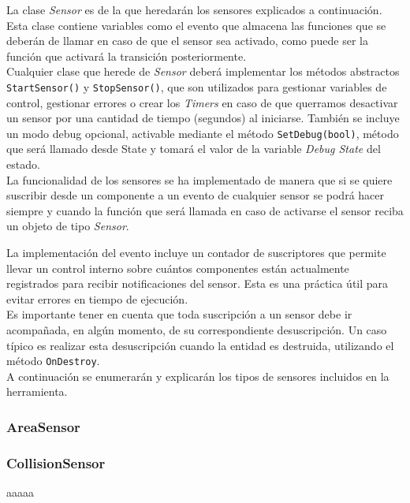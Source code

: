 La clase \textit{Sensor} es de la que heredarán los sensores explicados a continuación. Esta clase contiene variables como el evento que almacena las funciones que se deberán de llamar en caso de que el sensor sea activado, como puede ser la función que activará la transición posteriormente.\\

Cualquier clase que herede de \textit{Sensor} deberá implementar los métodos abstractos \texttt{StartSensor()} y \texttt{StopSensor()}, que son utilizados para gestionar variables de control, gestionar errores o crear los \textit{Timers} en caso de que querramos desactivar un sensor por una cantidad de tiempo (segundos) al iniciarse. También se incluye un modo debug opcional, activable mediante el método \texttt{SetDebug(bool)}, método que será llamado desde State y tomará el valor de la variable \textit{Debug State} del estado.\\

La funcionalidad de los sensores se ha implementado de manera que si se quiere suscribir desde un componente a un evento de cualquier sensor se podrá hacer siempre y cuando la función que será llamada en caso de activarse el sensor reciba un objeto de tipo \textit{Sensor}.\\


La implementación del evento incluye un contador de suscriptores que permite llevar un control interno sobre cuántos componentes están actualmente registrados para recibir notificaciones del sensor. Esta es una práctica útil para evitar errores en tiempo de ejecución.\\

Es importante tener en cuenta que toda suscripción a un sensor debe ir acompañada, en algún momento, de su correspondiente desuscripción. Un caso típico es realizar esta desuscripción cuando la entidad es destruida, utilizando el método \texttt{OnDestroy}.\\

A continuación se enumerarán y explicarán los tipos de sensores incluidos en la herramienta.\\
\subsubsection{AreaSensor}

\subsubsection{CollisionSensor}
aaaaa

